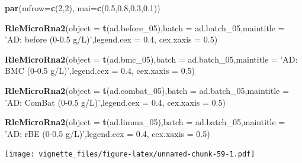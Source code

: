 \documentclass[]{book}
\newenvironment{Shaded}{\begin{snugshade}}{\end{snugshade}}
\newcommand{\KeywordTok}[1]{\textcolor[rgb]{0.13,0.29,0.53}{\textbf{#1}}}
\newcommand{\DataTypeTok}[1]{\textcolor[rgb]{0.13,0.29,0.53}{#1}}
\newcommand{\DecValTok}[1]{\textcolor[rgb]{0.00,0.00,0.81}{#1}}
\newcommand{\FloatTok}[1]{\textcolor[rgb]{0.00,0.00,0.81}{#1}}
\newcommand{\StringTok}[1]{\textcolor[rgb]{0.31,0.60,0.02}{#1}}
\newcommand{\NormalTok}[1]{#1}
\begin{document}
\begin{Shaded}
\begin{Highlighting}[]
\KeywordTok{par}\NormalTok{(}\DataTypeTok{mfrow=}\KeywordTok{c}\NormalTok{(}\DecValTok{2}\NormalTok{,}\DecValTok{2}\NormalTok{), }\DataTypeTok{mai=}\KeywordTok{c}\NormalTok{(}\FloatTok{0.5}\NormalTok{,}\FloatTok{0.8}\NormalTok{,}\FloatTok{0.3}\NormalTok{,}\FloatTok{0.1}\NormalTok{))}

\KeywordTok{RleMicroRna2}\NormalTok{(}\DataTypeTok{object =} \KeywordTok{t}\NormalTok{(ad.before_}\DecValTok{05}\NormalTok{),}\DataTypeTok{batch =}\NormalTok{ ad.batch_}\DecValTok{05}\NormalTok{,}\DataTypeTok{maintitle =} \StringTok{'AD: before (0-0.5 g/L)'}\NormalTok{,}\DataTypeTok{legend.cex =} \FloatTok{0.4}\NormalTok{, }\DataTypeTok{cex.xaxis =} \FloatTok{0.5}\NormalTok{)}

\KeywordTok{RleMicroRna2}\NormalTok{(}\DataTypeTok{object =} \KeywordTok{t}\NormalTok{(ad.bmc_}\DecValTok{05}\NormalTok{),}\DataTypeTok{batch =}\NormalTok{ ad.batch_}\DecValTok{05}\NormalTok{,}\DataTypeTok{maintitle =} \StringTok{'AD: BMC (0-0.5 g/L)'}\NormalTok{,}\DataTypeTok{legend.cex =} \FloatTok{0.4}\NormalTok{, }\DataTypeTok{cex.xaxis =} \FloatTok{0.5}\NormalTok{)}

\KeywordTok{RleMicroRna2}\NormalTok{(}\DataTypeTok{object =} \KeywordTok{t}\NormalTok{(ad.combat_}\DecValTok{05}\NormalTok{),}\DataTypeTok{batch =}\NormalTok{ ad.batch_}\DecValTok{05}\NormalTok{,}\DataTypeTok{maintitle =} \StringTok{'AD: ComBat (0-0.5 g/L)'}\NormalTok{,}\DataTypeTok{legend.cex =} \FloatTok{0.4}\NormalTok{, }\DataTypeTok{cex.xaxis =} \FloatTok{0.5}\NormalTok{)}

\KeywordTok{RleMicroRna2}\NormalTok{(}\DataTypeTok{object =} \KeywordTok{t}\NormalTok{(ad.limma_}\DecValTok{05}\NormalTok{),}\DataTypeTok{batch =}\NormalTok{ ad.batch_}\DecValTok{05}\NormalTok{,}\DataTypeTok{maintitle =} \StringTok{'AD: rBE (0-0.5 g/L)'}\NormalTok{,}\DataTypeTok{legend.cex =} \FloatTok{0.4}\NormalTok{, }\DataTypeTok{cex.xaxis =} \FloatTok{0.5}\NormalTok{)}
\end{Highlighting}
\end{Shaded}

\texttt{[image: vignette\_files/figure-latex/unnamed-chunk-59-1.pdf]}
\end{document}
